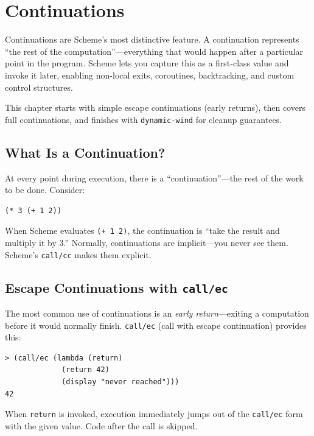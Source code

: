 \chapter{Continuations}

Continuations are Scheme's most distinctive feature. A continuation represents ``the rest of the computation''---everything that would happen after a particular point in the program. Scheme lets you capture this as a first-class value and invoke it later, enabling non-local exits, coroutines, backtracking, and custom control structures.

This chapter starts with simple escape continuations (early returns), then covers full continuations, and finishes with \texttt{dynamic-wind} for cleanup guarantees.

\section{What Is a Continuation?}

At every point during execution, there is a ``continuation''---the rest of the work to be done. Consider:

\begin{lstlisting}
(* 3 (+ 1 2))
\end{lstlisting}

When Scheme evaluates \texttt{(+ 1 2)}, the continuation is ``take the result and multiply it by 3.'' Normally, continuations are implicit---you never see them. Scheme's \texttt{call/cc} makes them explicit.

\section{Escape Continuations with \texttt{call/ec}}

The most common use of continuations is an \emph{early return}---exiting a computation before it would normally finish. \texttt{call/ec} (call with escape continuation) provides this:

\begin{lstlisting}[style=repl]
> (call/ec (lambda (return)
             (return 42)
             (display "never reached")))
42
\end{lstlisting}

When \texttt{return} is invoked, execution immediately jumps out of the \texttt{call/ec} form with the given value. Code after the call is skipped.

